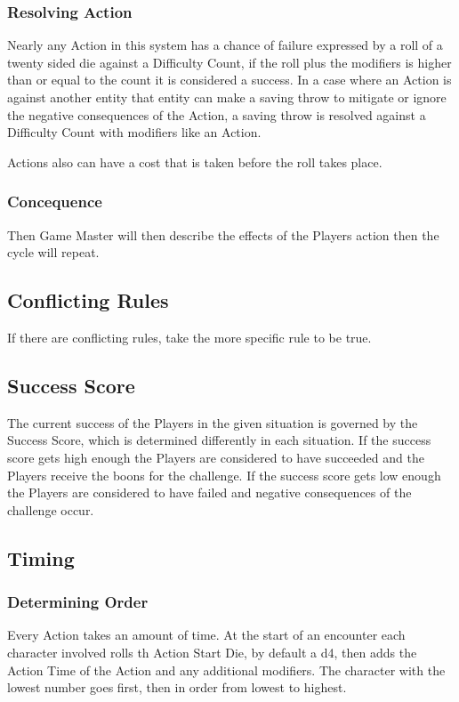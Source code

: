 \documentclass[a4paper,12pt,oneside]{book}
\begin{document}
                \subsubsection{Resolving Action}
                Nearly any Action in this system has a chance of failure expressed by a roll of a twenty sided die against a Difficulty Count, if the roll plus the modifiers is higher than or equal to the count it is considered a success. In a case where an Action is against another entity that entity can make a saving throw to mitigate or ignore the negative consequences of the Action, a saving throw is resolved against a Difficulty Count with modifiers like an Action.

                Actions also can have a cost that is taken before the roll takes place.

                \subsubsection{Concequence}
                Then Game Master will then describe the effects of the Players action then the cycle will repeat.

            \subsection{Conflicting Rules}
                If there are conflicting rules, take the more specific rule to be true.

            \subsection{Success Score}
                The current success of the Players in the given situation is governed by the Success Score, which is determined differently in each situation. If the success score gets high enough the Players are considered to have succeeded and the Players receive the boons for the challenge. If the success score gets low enough the Players are considered to have failed and negative consequences of the challenge occur.
            
            \subsection{Timing}
                \subsubsection{Determining Order}
                    Every Action takes an amount of time. At the start of an encounter each character involved rolls th Action Start Die, by default a d4, then adds the Action Time of the Action and any additional modifiers. The character with the lowest number goes first, then in order from lowest to highest.
\end{document}
